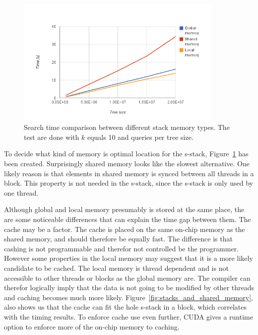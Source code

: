\begin{figure}[ht]
    \centering
    \includegraphics[width=100mm]{../gfx/stack_speed.png}
    \caption{Search time comparison between different stack memory types. The test are done with $k$ equals 10 and  queries per tree size. }
    \label{tbl:stack_speed}
\end{figure}

To decide what kind of memory is optimal location for the s-stack, Figure~\ref{tbl:stack_speed} has been created. Surprisingly shared memory looks like the slowest alternative. One likely reason is that elements in shared memory is synced between all threads in a block. This property is not needed in the s-stack, since the s-stack is only used by one thread.

Although global and local memory presumably is stored at the same place, the are some noticeable differences that can explain the time gap between them. The cache may be a factor. The cache is placed on the same on-chip memory as the shared memory, and should therefore be equally fast. The difference is that cashing is not programmable and therefor not controlled be the programmer. However some properties in the local memory may suggest that it is a more likely candidate to be cached. The local memory is thread dependent and is not accessible to other threads or blocks as the global memory are. The compiler can therefor logically imply that the data is not going to be modified by other threads and caching becomes much more likely. Figure~\ref{fig:stacks_and_shared_memory}, also shows us that the cache can fit the hole s-stack in a block, which correlates with the timing results. To enforce cache use even further, CUDA gives a runtime option to enforce more of the on-chip memory to caching.

